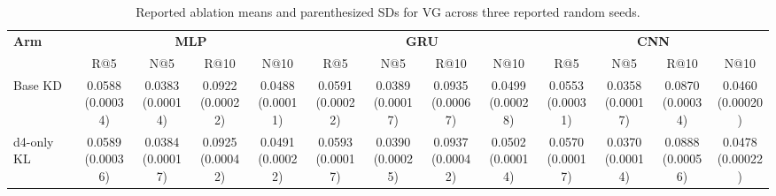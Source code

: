 \begin{table}[t]
\centering
\caption{Reported ablation means and parenthesized SDs for VG across three reported random seeds.}
\fontsize{6.6}{7.8}\selectfont
\setlength{\tabcolsep}{1.0pt}
\renewcommand{\arraystretch}{1.10}
\begin{tabular*}{\textwidth}{@{\extracolsep{\fill}} l *{12}{c} @{}}
\toprule
\textbf{Arm} & \multicolumn{4}{c}{\textbf{MLP}} & \multicolumn{4}{c}{\textbf{GRU}} & \multicolumn{4}{c}{\textbf{CNN}} \\
\cmidrule(lr){2-5}\cmidrule(lr){6-9}\cmidrule(l){10-13}
 & R@5 & N@5 & R@10 & N@10 & R@5 & N@5 & R@10 & N@10 & R@5 & N@5 & R@10 & N@10 \\
\midrule
Base KD & \shortstack[c]{0.0588\\[-1pt]{\tiny(0.00034)}} & \shortstack[c]{0.0383\\[-1pt]{\tiny(0.00014)}} & \shortstack[c]{0.0922\\[-1pt]{\tiny(0.00022)}} & \shortstack[c]{0.0488\\[-1pt]{\tiny(0.00011)}} & \shortstack[c]{0.0591\\[-1pt]{\tiny(0.00022)}} & \shortstack[c]{0.0389\\[-1pt]{\tiny(0.00017)}} & \shortstack[c]{0.0935\\[-1pt]{\tiny(0.00067)}} & \shortstack[c]{0.0499\\[-1pt]{\tiny(0.00028)}} & \shortstack[c]{0.0553\\[-1pt]{\tiny(0.00031)}} & \shortstack[c]{0.0358\\[-1pt]{\tiny(0.00017)}} & \shortstack[c]{0.0870\\[-1pt]{\tiny(0.00034)}} & \shortstack[c]{0.0460\\[-1pt]{\tiny(0.00020)}} \\
\addlinespace[1pt]
d4-only KL & \shortstack[c]{0.0589\\[-1pt]{\tiny(0.00036)}} & \shortstack[c]{0.0384\\[-1pt]{\tiny(0.00017)}} & \shortstack[c]{0.0925\\[-1pt]{\tiny(0.00042)}} & \shortstack[c]{0.0491\\[-1pt]{\tiny(0.00022)}} & \shortstack[c]{0.0593\\[-1pt]{\tiny(0.00017)}} & \shortstack[c]{0.0390\\[-1pt]{\tiny(0.00025)}} & \shortstack[c]{0.0937\\[-1pt]{\tiny(0.00042)}} & \shortstack[c]{0.0502\\[-1pt]{\tiny(0.00014)}} & \shortstack[c]{0.0570\\[-1pt]{\tiny(0.00017)}} & \shortstack[c]{0.0370\\[-1pt]{\tiny(0.00014)}} & \shortstack[c]{0.0888\\[-1pt]{\tiny(0.00056)}} & \shortstack[c]{0.0478\\[-1pt]{\tiny(0.00022)}} \\

\end{tabular*}
\end{table}
